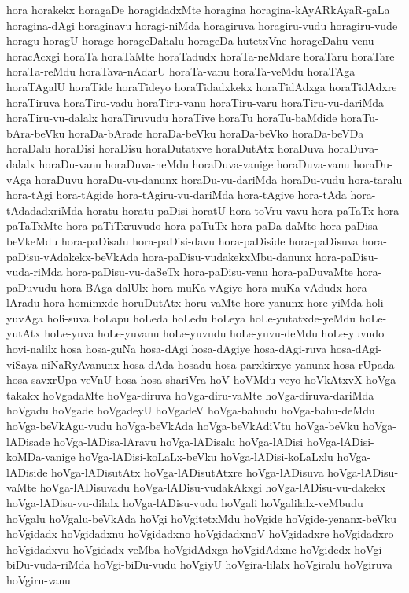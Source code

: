 {hora
horakekx
horagaDe
horagidadxMte
horagina
horagina-kAyARkAyaR-gaLa
horagina-dAgi
horaginavu
horagi-niMda
horagiruva
horagiru-vudu
horagiru-vude
horagu
horagU
horage
horageDahalu
horageDa-hutetxVne
horageDahu-venu
horacAcxgi
horaTa
horaTaMte
horaTadudx
horaTa-neMdare
horaTaru
horaTare
horaTa-reMdu
horaTava-nAdarU
horaTa-vanu
horaTa-veMdu
horaTAga
horaTAgalU
horaTide
horaTideyo
horaTidadxkekx
horaTidAdxga
horaTidAdxre
horaTiruva
horaTiru-vadu
horaTiru-vanu
horaTiru-varu
horaTiru-vu-dariMda
horaTiru-vu-dalalx
horaTiruvudu
horaTive
horaTu
horaTu-baMdide
horaTu-bAra-beVku
horaDa-bArade
horaDa-beVku
horaDa-beVko
horaDa-beVDa
horaDalu
horaDisi
horaDisu
horaDutatxve
horaDutAtx
horaDuva
horaDuva-dalalx
horaDu-vanu
horaDuva-neMdu
horaDuva-vanige
horaDuva-vanu
horaDu-vAga
horaDuvu
horaDu-vu-danunx
horaDu-vu-dariMda
horaDu-vudu
hora-taralu
hora-tAgi
hora-tAgide
hora-tAgiru-vu-dariMda
hora-tAgive
hora-tAda
hora-tAdadadxriMda
horatu
horatu-paDisi
horatU
hora-toVru-vavu
hora-paTaTx
hora-paTaTxMte
hora-paTiTxruvudo
hora-paTuTx
hora-paDa-daMte
hora-paDisa-beVkeMdu
hora-paDisalu
hora-paDisi-davu
hora-paDiside
hora-paDisuva
hora-paDisu-vAdakekx-beVkAda
hora-paDisu-vudakekxMbu-danunx
hora-paDisu-vuda-riMda
hora-paDisu-vu-daSeTx
hora-paDisu-venu
hora-paDuvaMte
hora-paDuvudu
hora-BAga-dalUlx
hora-muKa-vAgiye
hora-muKa-vAdudx
hora-lAradu
hora-homimxde
horuDutAtx
horu-vaMte
hore-yanunx
hore-yiMda
holi-yuvAga
holi-suva
hoLapu
hoLeda
hoLedu
hoLeya
hoLe-yutatxde-yeMdu
hoLe-yutAtx
hoLe-yuva
hoLe-yuvanu
hoLe-yuvudu
hoLe-yuvu-deMdu
hoLe-yuvudo
hovi-nalilx
hosa
hosa-guNa
hosa-dAgi
hosa-dAgiye
hosa-dAgi-ruva
hosa-dAgi-viSaya-niNaRyAvanunx
hosa-dAda
hosadu
hosa-parxkirxye-yanunx
hosa-rUpada
hosa-savxrUpa-veVnU
hosa-hosa-shariVra
hoV
hoVMdu-veyo
hoVkAtxvX
hoVga-takakx
hoVgadaMte
hoVga-diruva
hoVga-diru-vaMte
hoVga-diruva-dariMda
hoVgadu
hoVgade
hoVgadeyU
hoVgadeV
hoVga-bahudu
hoVga-bahu-deMdu
hoVga-beVkAgu-vudu
hoVga-beVkAda
hoVga-beVkAdiVtu
hoVga-beVku
hoVga-lADisade
hoVga-lADisa-lAravu
hoVga-lADisalu
hoVga-lADisi
hoVga-lADisi-koMDa-vanige
hoVga-lADisi-koLaLx-beVku
hoVga-lADisi-koLaLxlu
hoVga-lADiside
hoVga-lADisutAtx
hoVga-lADisutAtxre
hoVga-lADisuva
hoVga-lADisu-vaMte
hoVga-lADisuvadu
hoVga-lADisu-vudakAkxgi
hoVga-lADisu-vu-dakekx
hoVga-lADisu-vu-dilalx
hoVga-lADisu-vudu
hoVgali
hoVgalilalx-veMbudu
hoVgalu
hoVgalu-beVkAda
hoVgi
hoVgitetxMdu
hoVgide
hoVgide-yenanx-beVku
hoVgidadx
hoVgidadxnu
hoVgidadxno
hoVgidadxnoV
hoVgidadxre
hoVgidadxro
hoVgidadxvu
hoVgidadx-veMba
hoVgidAdxga
hoVgidAdxne
hoVgidedx
hoVgi-biDu-vuda-riMda
hoVgi-biDu-vudu
hoVgiyU
hoVgira-lilalx
hoVgiralu
hoVgiruva
hoVgiru-vanu
}
